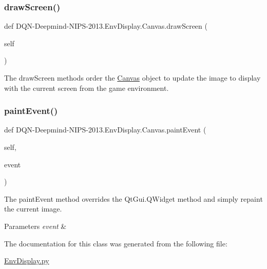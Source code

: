\subsubsection{\texorpdfstring{draw\+Screen()}{drawScreen()}}
{\footnotesize\ttfamily def D\+QN-\/Deepmind-\/N\+I\+PS-\/2013.Env\+Display.\+Canvas.\+draw\+Screen (\begin{DoxyParamCaption}\item[{}]{self }\end{DoxyParamCaption})}



The draw\+Screen methods order the \hyperlink{classDQN-Deepmind-NIPS-2013_1_1EnvDisplay_1_1Canvas}{Canvas} object to update the image to display with the current screen from the game environment. 

\hypertarget{classDQN-Deepmind-NIPS-2013_1_1EnvDisplay_1_1Canvas_a7bb5fe211a49f4ead25e6ebdb02f32af}{}\label{classDQN-Deepmind-NIPS-2013_1_1EnvDisplay_1_1Canvas_a7bb5fe211a49f4ead25e6ebdb02f32af} 
\subsubsection{\texorpdfstring{paint\+Event()}{paintEvent()}}
{\footnotesize\ttfamily def D\+QN-\/Deepmind-\/N\+I\+PS-\/2013.Env\+Display.\+Canvas.\+paint\+Event (\begin{DoxyParamCaption}\item[{}]{self,  }\item[{}]{event }\end{DoxyParamCaption})}



The paint\+Event method overrides the Qt\+Gui.\+Q\+Widget method and simply repaint the current image. 


\begin{DoxyParams}{Parameters}
{\em event} & \\
\hline
\end{DoxyParams}


The documentation for this class was generated from the following file\+:\begin{DoxyCompactItemize}
\item 
\hyperlink{EnvDisplay_8py}{Env\+Display.\+py}\end{DoxyCompactItemize}
